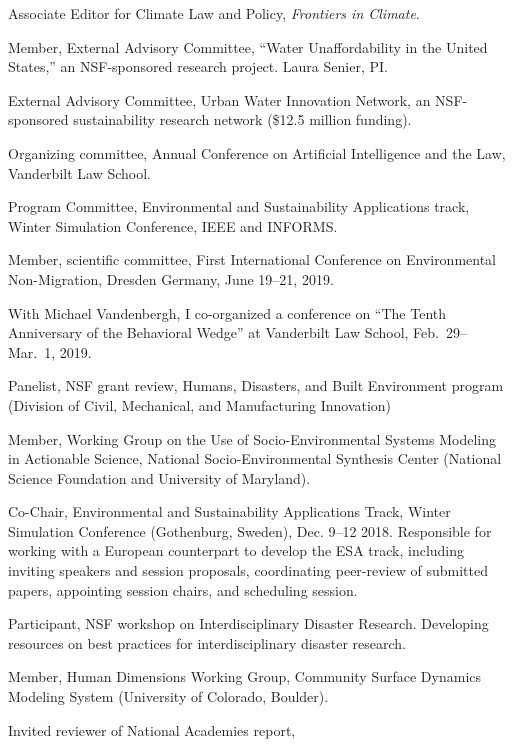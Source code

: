 \item[2021--present] Associate Editor for Climate Law and Policy,
   \emph{Frontiers in Climate}.
\item[2020--present] Member, External Advisory Committee,
  ``Water Unaffordability in the United States,''
  an NSF-sponsored research project. Laura Senier, PI.
\item[2016--present] External Advisory Committee,
  Urban Water Innovation Network, an NSF-sponsored sustainability
  research network (\$12.5 million funding).
\item[2016--present] Organizing committee,
  Annual Conference on Artificial Intelligence and the Law,
  Vanderbilt Law School.
\item[2016--present] Program Committee,
  Environmental and Sustainability Applications track,
  Winter Simulation Conference, IEEE and INFORMS.
\item[2019] Member, scientific committee,
  First International Conference on Environmental Non-Migration,
  Dresden Germany, June 19--21, 2019.
\item[2019] With Michael Vandenbergh, I co-organized a conference on
  ``The Tenth Anniversary of the Behavioral Wedge'' at Vanderbilt Law School,
   Feb.~29--Mar.~1, 2019.
\item[2018] Panelist, NSF grant review,
  Humans, Disasters, and Built Environment program
  (Division of Civil, Mechanical, and Manufacturing Innovation)
\item[2018] Member, Working Group on the Use of Socio-Environmental Systems
  Modeling in Actionable Science,
  National Socio-Environmental Synthesis Center
  (National Science Foundation and University of Maryland).
\item[2018] Co-Chair, Environmental and Sustainability Applications Track,
   Winter Simulation Conference (Gothenburg, Sweden), Dec. 9--12 2018.
   Responsible for working with a European counterpart to develop the ESA
   track, including inviting speakers and session proposals, coordinating
   peer-review of submitted papers, appointing session chairs, and scheduling
   session.
\item[2017--2018] Participant, NSF workshop on
  Interdisciplinary Disaster Research.
  Developing resources on best practices for interdisciplinary disaster
  research.
\item[2017--2018] Member, Human Dimensions Working Group,
  Community Surface Dynamics Modeling System (University of Colorado, Boulder).
\item[2017] Invited reviewer of National Academies report,
